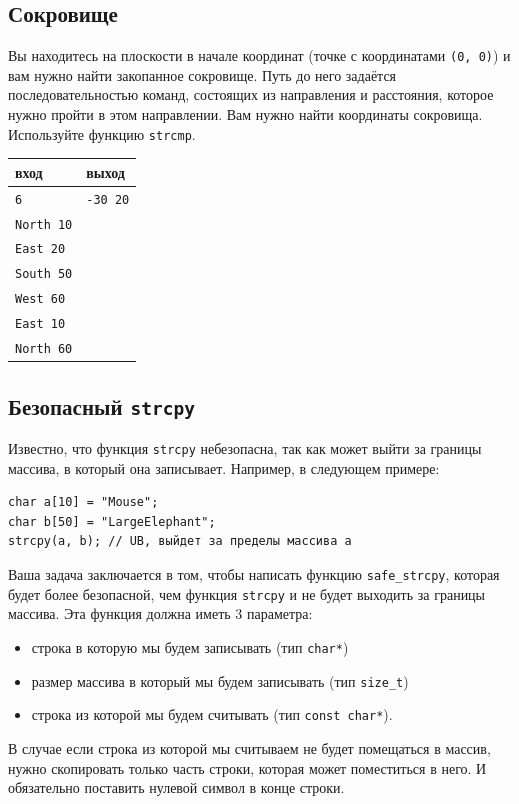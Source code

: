 \documentclass{article}
\begin{document}
\subsection{Сокровище}
Вы находитесь на плоскости в начале координат (точке с координатами \texttt{(0, 0)}) и вам нужно найти закопанное сокровище. Путь до него задаётся последовательностью команд, состоящих из направления и расстояния, которое нужно пройти в этом направлении. Вам нужно найти координаты сокровища. Используйте функцию \texttt{strcmp}.
\begin{center} 
\begin{tabular}{ l | l }
 вход & выход \\ \hline
 \texttt{6} & \texttt{-30 20}\\
 \texttt{North 10} & \\
 \texttt{East 20} &\\
 \texttt{South 50} &\\
 \texttt{West 60} &\\
 \texttt{East 10} &\\
 \texttt{North 60} &\\
\end{tabular}
\end{center}


\subsection{Безопасный \texttt{strcpy}}
Известно, что функция \texttt{strcpy} небезопасна, так как может выйти за границы массива, в который она записывает.
Например, в следующем примере:
\begin{lstlisting}
char a[10] = "Mouse";
char b[50] = "LargeElephant";
strcpy(a, b); // UB, выйдет за пределы массива a
\end{lstlisting}
Ваша задача заключается в том, чтобы написать функцию \texttt{safe\_strcpy}, которая будет более безопасной, чем функция \texttt{strcpy} и не будет выходить за границы массива. Эта функция должна иметь 3 параметра:
\begin{itemize}
\item строка в которую мы будем записывать (тип \texttt{char*})
\item размер массива в который мы будем записывать (тип \texttt{size\_t})
\item строка из которой мы будем считывать (тип \texttt{const char*}).
\end{itemize}
В случае если строка из которой мы считываем не будет помещаться в массив, нужно скопировать только часть строки, которая может поместиться в него. И обязательно поставить нулевой символ в конце строки.
\end{document}
